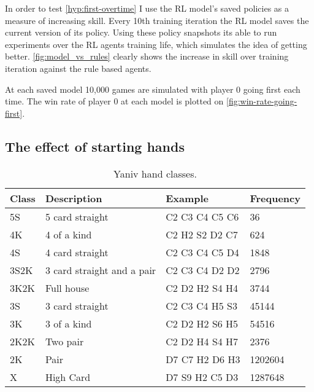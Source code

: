 \documentclass[../main.tex]{subfiles}
\begin{document}

In order to test \cref{hyp:first-overtime} I use the RL model's saved policies as a measure of increasing skill. Every 10th training iteration the RL model saves the current version of its policy. Using these policy snapshots its able to run experiments over the RL agents training life, which simulates the idea of getting better. \autoref{fig:model_vs_rules} clearly shows the increase in skill over training iteration against the rule based agents. 

At each saved model 10,000 games are simulated with player 0 going first each time. The win rate of player 0 at each model is plotted on \autoref{fig:win-rate-going-first}.


\subsection{The effect of starting hands}
\begin{table}[]
\centering
\begin{tabular}{@{}llll@{}}
\toprule
Class & Description                           & Example        & Frequency \\ \midrule
5S    & 5 card straight                       & C2 C3 C4 C5 C6 & 36        \\
4K    & 4 of a kind                           & C2 H2 S2 D2 C7 & 624       \\
4S    & 4 card straight                       & C2 C3 C4 C5 D4 & 1848      \\
3S2K  & 3 card straight and a pair            & C2 C3 C4 D2 D2 & 2796      \\
3K2K  & Full house                            & C2 D2 H2 S4 H4 & 3744      \\
3S    & 3 card straight                       & C2 C3 C4 H5 S3 & 45144     \\
3K    & 3 of a kind                           & C2 D2 H2 S6 H5 & 54516     \\
2K2K  & Two pair                              & C2 D2 H4 S4 H7 & 2376      \\
2K    & Pair                                  & D7 C7 H2 D6 H3 & 1202604   \\
X     & High Card                             & D7 S9 H2 C5 D3 & 1287648   \\ \bottomrule
\end{tabular}
\caption{Yaniv hand classes.}
\label{tab:hand-classes}
\end{table}
\end{document}
